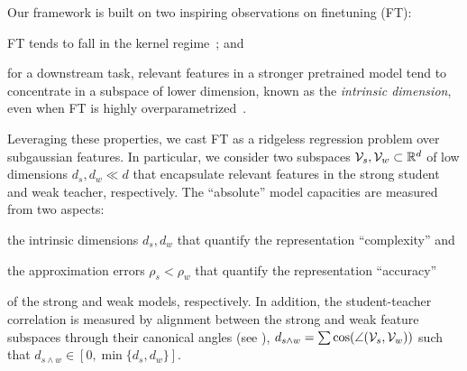 Our framework is built on two inspiring observations on finetuning (FT): 
\begin{enumerate*}[label=(\roman*)]
    \item FT tends to fall in the kernel regime~\citep{jacot2018neural,wei2022more,malladi2023kernel}; and
    \item for a downstream task, relevant features in a stronger pretrained model tend to concentrate in a subspace of lower dimension, known as the \emph{intrinsic dimension}, even when FT is highly overparametrized~\citep{aghajanyan2020intrinsic}. 
\end{enumerate*}
Leveraging these properties, we cast FT as a ridgeless regression problem over subgaussian features.
In particular, we consider two subspaces $\mathcal{V}_s, \mathcal{V}_w \subset \mathbb{R}^d$ of low dimensions $d_s, d_w \ll d$ that encapsulate relevant features in the strong student and weak teacher, respectively.
The ``absolute'' model capacities are measured from two aspects: 
\begin{enumerate*}[label=(\roman*)]
    \item the intrinsic dimensions $d_s, d_w$ that quantify the representation ``complexity'' and
    \item the approximation errors $\rho_s < \rho_w$ that quantify the representation ``accuracy''
\end{enumerate*}
of the strong and weak models, respectively.
In addition, the student-teacher correlation is measured by alignment between the strong and weak feature subspaces through their canonical angles (see ), $d_{s \wedge w} = \sum \cos(\angle(\mathcal{V}_s, \mathcal{V}_w))$ such that $d_{s \wedge w} \in [0, \min\{d_s, d_w\}]$.

